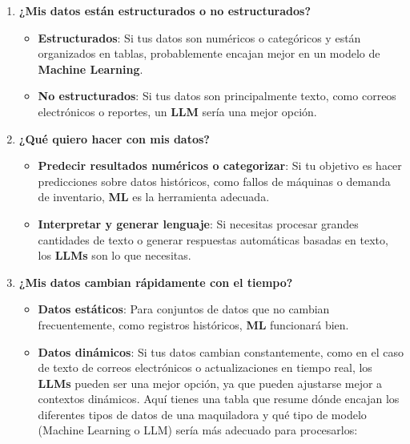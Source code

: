 \documentclass[
  10pt,
  letterpaper,
]{book}
\providecommand{\tightlist}{%
  \setlength{\itemsep}{0pt}\setlength{\parskip}{0pt}}\usepackage{longtable,booktabs,array}
\begin{document}
\begin{enumerate}
\def\labelenumi{\arabic{enumi}.}
\tightlist
\item
  \textbf{¿Mis datos están estructurados o no estructurados?}

  \begin{itemize}
  \tightlist
  \item
    \textbf{Estructurados}: Si tus datos son numéricos o categóricos y
    están organizados en tablas, probablemente encajan mejor en un
    modelo de \textbf{Machine Learning}.
  \item
    \textbf{No estructurados}: Si tus datos son principalmente texto,
    como correos electrónicos o reportes, un \textbf{LLM} sería una
    mejor opción.
  \end{itemize}
\item
  \textbf{¿Qué quiero hacer con mis datos?}

  \begin{itemize}
  \tightlist
  \item
    \textbf{Predecir resultados numéricos o categorizar}: Si tu objetivo
    es hacer predicciones sobre datos históricos, como fallos de
    máquinas o demanda de inventario, \textbf{ML} es la herramienta
    adecuada.
  \item
    \textbf{Interpretar y generar lenguaje}: Si necesitas procesar
    grandes cantidades de texto o generar respuestas automáticas basadas
    en texto, los \textbf{LLMs} son lo que necesitas.
  \end{itemize}
\item
  \textbf{¿Mis datos cambian rápidamente con el tiempo?}

  \begin{itemize}
  \tightlist
  \item
    \textbf{Datos estáticos}: Para conjuntos de datos que no cambian
    frecuentemente, como registros históricos, \textbf{ML} funcionará
    bien.
  \item
    \textbf{Datos dinámicos}: Si tus datos cambian constantemente, como
    en el caso de texto de correos electrónicos o actualizaciones en
    tiempo real, los \textbf{LLMs} pueden ser una mejor opción, ya que
    pueden ajustarse mejor a contextos dinámicos. Aquí tienes una tabla
    que resume dónde encajan los diferentes tipos de datos de una
    maquiladora y qué tipo de modelo (Machine Learning o LLM) sería más
    adecuado para procesarlos:
  \end{itemize}
\end{enumerate}
\end{document}
